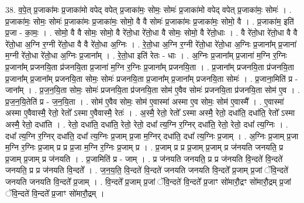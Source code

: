 \documentclass[17pt]{extarticle}
\begin{document}
38. व॒पे॒त् प्र॒जाका॑मः प्र॒जाका॑मो वपेद् वपेत् प्र॒जाका॑मः॒ सोमः॒ सोमः॑ प्र॒जाका॑मो वपेद् वपेत् प्र॒जाका॑मः॒ सोमः॑ । . प्र॒जाका॑मः॒ सोमः॒ सोमः॑ प्र॒जाका॑मः प्र॒जाका॑मः॒ सोमो॒ वै वै सोमः॑ प्र॒जाका॑मः प्र॒जाका॑मः॒ सोमो॒ वै । . प्र॒जाका॑म॒ इति॑ प्र॒जा - का॒मः॒ । . सोमो॒ वै वै सोमः॒ सोमो॒ वै रे॑तो॒धा रे॑तो॒धा वै सोमः॒ सोमो॒ वै रे॑तो॒धाः । . वै रे॑तो॒धा रे॑तो॒धा वै वै रे॑तो॒धा अ॒ग्नि र॒ग्नी रे॑तो॒धा वै वै रे॑तो॒धा अ॒ग्निः । . रे॒तो॒धा अ॒ग्नि र॒ग्नी रे॑तो॒धा रे॑तो॒धा अ॒ग्निः प्र॒जाना᳚म् प्र॒जाना॑ म॒ग्नी रे॑तो॒धा रे॑तो॒धा अ॒ग्निः प्र॒जाना᳚म् । . रे॒तो॒धा इति॑ रेतः - धाः । . अ॒ग्निः प्र॒जाना᳚म् प्र॒जाना॑ म॒ग्नि र॒ग्निः प्र॒जाना᳚म् प्रजनयि॒ता प्र॑जनयि॒ता प्र॒जाना॑ म॒ग्नि र॒ग्निः प्र॒जाना᳚म् प्रजनयि॒ता । . प्र॒जाना᳚म् प्रजनयि॒ता प्र॑जनयि॒ता प्र॒जाना᳚म् प्र॒जाना᳚म् प्रजनयि॒ता सोमः॒ सोमः॑ प्रजनयि॒ता प्र॒जाना᳚म् प्र॒जाना᳚म् प्रजनयि॒ता सोमः॑ । . प्र॒जाना॒मिति॑ प्र - जाना᳚म् । . प्र॒ज॒न॒यि॒ता सोमः॒ सोमः॑ प्रजनयि॒ता प्र॑जनयि॒ता सोम॑ ए॒वैव सोमः॑ प्रजनयि॒ता प्र॑जनयि॒ता सोम॑ ए॒व । . प्र॒ज॒न॒यि॒तेति॑ प्र - ज॒न॒यि॒ता । . सोम॑ ए॒वैव सोमः॒ सोम॑ ए॒वास्मा॑ अस्मा ए॒व सोमः॒ सोम॑ ए॒वास्मै᳚ । . ए॒वास्मा॑ अस्मा ए॒वैवास्मै॒ रेतो॒ रेतो᳚ ऽस्मा ए॒वैवास्मै॒ रेतः॑ । . अ॒स्मै॒ रेतो॒ रेतो᳚ ऽस्मा अस्मै॒ रेतो॒ दधा॑ति॒ दधा॑ति॒ रेतो᳚ ऽस्मा अस्मै॒ रेतो॒ दधा॑ति । . रेतो॒ दधा॑ति॒ दधा॑ति॒ रेतो॒ रेतो॒ दधा᳚ त्य॒ग्नि र॒ग्निर् दधा॑ति॒ रेतो॒ रेतो॒ दधा᳚ त्य॒ग्निः । . दधा᳚ त्य॒ग्नि र॒ग्निर् दधा॑ति॒ दधा᳚ त्य॒ग्निः प्र॒जाम् प्र॒जा म॒ग्निर् दधा॑ति॒ दधा᳚ त्य॒ग्निः प्र॒जाम् । . अ॒ग्निः प्र॒जाम् प्र॒जा म॒ग्नि र॒ग्निः प्र॒जाम् प्र प्र प्र॒जा म॒ग्नि र॒ग्निः प्र॒जाम् प्र । . प्र॒जाम् प्र प्र प्र॒जाम् प्र॒जाम् प्र ज॑नयति जनयति॒ प्र प्र॒जाम् प्र॒जाम् प्र ज॑नयति । . प्र॒जामिति॑ प्र - जाम् । . प्र ज॑नयति जनयति॒ प्र प्र ज॑नयति वि॒न्दते॑ वि॒न्दते॑ जनयति॒ प्र प्र ज॑नयति वि॒न्दते᳚ । . ज॒न॒य॒ति॒ वि॒न्दते॑ वि॒न्दते॑ जनयति जनयति वि॒न्दते᳚ प्र॒जाम् प्र॒जां ॅवि॒न्दते॑ जनयति जनयति वि॒न्दते᳚ प्र॒जाम् । . वि॒न्दते᳚ प्र॒जाम् प्र॒जां ॅवि॒न्दते॑ वि॒न्दते᳚ प्र॒जाꣳ सो॑मारौ॒द्रꣳ सो॑मारौ॒द्रम् प्र॒जां ॅवि॒न्दते॑ वि॒न्दते᳚ प्र॒जाꣳ सो॑मारौ॒द्रम् । \newline
\pagebreak
{}
\end{document}
